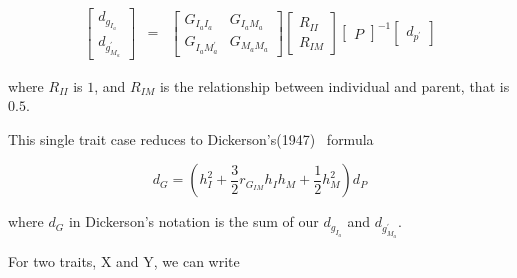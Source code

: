 \documentclass[titlepage]{article}  %
\begin{document}
\begin{eqnarray*}
 \left[ \begin{array}{c}
 d_{g_{I_{a}}} \\
 d_{g^{\prime}_{M_{a}}}
\end{array} \right]
 & = &
 \left[ \begin{array}{cc}
 G_{I_{a}I_{a}} & G_{I_{a}M_{a}} \\ 
 G_{I_{a}M^{\prime}_{a}} & G_{M_{a}M_{a}}
\end{array} \right]
\left[ \begin{array}{cc}
 R_{II} \\ 
 R_{IM} 
\end{array} \right] 
\left[ \begin{array}{c}
 P
\end{array} \right] ^{-1}
 \left[ \begin{array}{c}
 d_{p^{\prime}}
\end{array} \right]
\end{eqnarray*}

where $R_{II}$ is $1$, and $R_{IM}$ is the relationship between individual and parent, that is $0.5$.

This single trait case reduces to Dickerson's(1947)~\cite{dick:47} formula 

\begin{displaymath}
d_{G} = (h^{2}_{I} + \frac{3}{2} r_{G_{IM}}h_{I}h_{M} + \frac{1}{2}h^{2}_{M}) d_{P} 
\end{displaymath}

where $d_{G}$ in Dickerson's notation is the sum of our $d_{g_{I_{a}}}$ and $d_{g^{\prime}_{M_{a}}}$.

For two traits, X and Y, we can write
 
\end{document}
